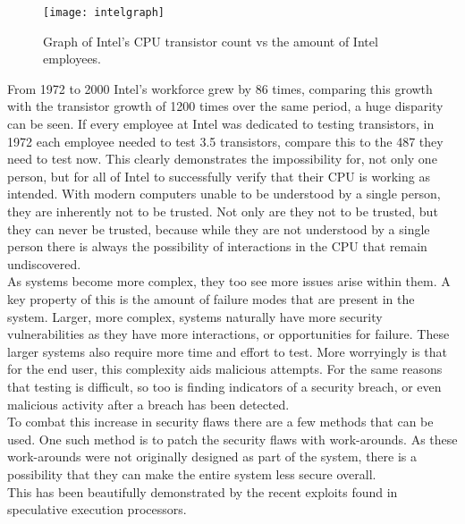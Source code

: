 \begin{figure}
  \centering
  \texttt{[image: intelgraph]}
  \caption{Graph of Intel's CPU transistor count vs the amount of Intel employees.\\ \cite{Reference28}\cite{Reference29}\cite{Reference30}\cite{Reference31}\cite{Reference32}\cite{Reference33}\cite{Reference34}\cite{Reference35}
}
  \label{fig:intelgraph}
\end{figure}

From 1972 to 2000 Intel’s workforce grew by 86 times, comparing this growth with the transistor growth of 1200 times over the same period, a huge disparity can be seen.
If every employee at Intel was dedicated to testing transistors, in 1972 each employee needed to test 3.5 transistors, compare this to the 487 they need to test now.
This clearly demonstrates the impossibility for, not only one person, but for all of Intel to successfully verify that their CPU is working as intended.
With modern computers unable to be understood by a single person, they are inherently not to be trusted.\cite{Reference4}
Not only are they not to be trusted, but they can never be trusted, because while they are not understood by a single person there is always the possibility of interactions in the CPU that remain undiscovered.\cite{Reference5}\\
As systems become more complex, they too see more issues arise within them.
A key property of this is the amount of failure modes that are present in the system.
Larger, more complex, systems naturally have more security vulnerabilities as they have more interactions, or opportunities for failure.\cite{Reference6}
These larger systems also require more time and effort to test.
More worryingly is that for the end user, this complexity aids malicious attempts.\cite{Reference7}
For the same reasons that testing is difficult, so too is finding indicators of a security breach, or even malicious activity after a breach has been detected.\cite{Reference8}\\
To combat this increase in security flaws there are a few methods that can be used.
One such method is to patch the security flaws with work-arounds.
As these work-arounds were not originally designed as part of the system, there is a possibility that they can make the entire system less secure overall.\\ 
This has been beautifully demonstrated by the recent exploits found in speculative execution processors.
